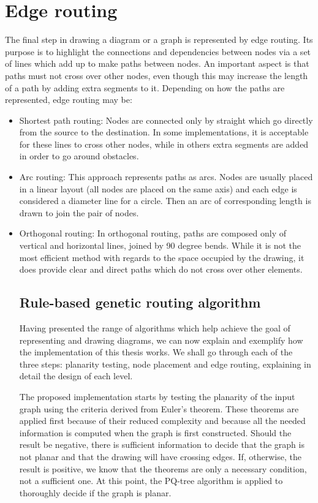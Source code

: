 \section{Edge routing}

The final step in drawing a diagram or a graph is represented by edge routing. Its purpose is to highlight the connections and dependencies between 
nodes via a set of lines which add up to make paths between nodes. An important aspect is that paths must not cross over other nodes, even though 
this may increase the length of a path by adding extra segments to it. Depending on how the paths are represented, edge routing may be:

\begin{itemize}

\item Shortest path routing: Nodes are connected only by straight which go directly from the source to the destination. In some implementations, it 
is acceptable for these lines to cross other nodes, while in others extra segments are added in order to go around obstacles.
\item Arc routing: This approach represents paths as arcs. Nodes are usually placed in a linear layout (all nodes are placed on the same axis) and 
each edge is considered a diameter line for a circle. Then an arc of corresponding length is drawn to join the pair of nodes.
\item Orthogonal routing: In orthogonal routing, paths are composed only of vertical and horizontal lines, joined by 90 degree bends. While it is 
not the most efficient method with regards to the space occupied by the drawing, it does provide clear and direct paths which do not cross over other elements.

\subsection{Rule-based genetic routing algorithm}

Having presented the range of algorithms which help achieve the goal of representing and drawing diagrams, we can now explain and exemplify how 
the implementation of this thesis works. We shall go through each of the three steps: planarity testing, node placement and edge routing, explaining in detail the design of each level.

The proposed implementation starts by testing the planarity of the input graph using the criteria derived from Euler's theorem. These theorems are 
applied first because of their reduced complexity and because all the needed information is computed when the graph is first constructed. Should the 
result be negative, there is sufficient information to decide that the graph is not planar and that the drawing will have crossing edges. 
If, otherwise, the result is positive, we know that the theorems are only a necessary condition, not a sufficient one. At this point, the PQ-tree 
algorithm is applied to thoroughly decide if the graph is planar.


\end{itemize}
